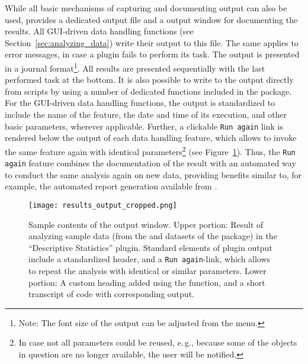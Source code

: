 While all basic mechanisms of
capturing and documenting  output can also
be used,  provides a dedicated output file and a output
window for documenting the results. All GUI-driven data handling
functions (see Section~\ref{sec:analyzing_data}) write their output to this file. 
The same applies to error messages, in case a plugin fails to perform its task.
The output is presented in a journal format\footnote{Note: The font size of the output can be adjusted
from the menu. 
}. All results are presented
sequentially with the last performed task at the bottom.
It is also possible to write to the output directly from 
scripts by using a number of dedicated 
functions included in the  package. For the GUI-driven data handling functions, the output is
standardized to include the name of the feature, the date and time of
its execution, and other basic parameters, wherever
applicable. Further, a clickable \texttt{Run
again} link is rendered below the output of each data
handling feature, which allows to invoke the same feature again with
identical parameters\footnote{In case not all parameters could be
reused, e.\,g., because some of the objects in
question are no longer available, the user will be notified.} (see
Figure~\ref{fig:results_output}). Thus, the \texttt{Run
again} feature combines the documentation of the result
with an automated way to conduct the same analysis again on new
data, providing benefits similar to, for example, the automated report generation
available from  \citep{RaffelsbergerW2008}.

\begin{figure}[t!]
 \centering
 \texttt{[image: results\_output\_cropped.png]}
 \caption{Sample contents of the output window. Upper portion: Result of analyzing sample data (from the
 and 
  datasets of the  package) in the ``Descriptive Statistics'' plugin. Standard elements of
  plugin output include a standardized header, and a  \texttt{Run again}-link, which allows to repeat the
  analysis with identical or similar parameters. Lower portion: A custom heading added using the
   function, and a short transcript of  code with corresponding output.}
 \label{fig:results_output}
\end{figure}

